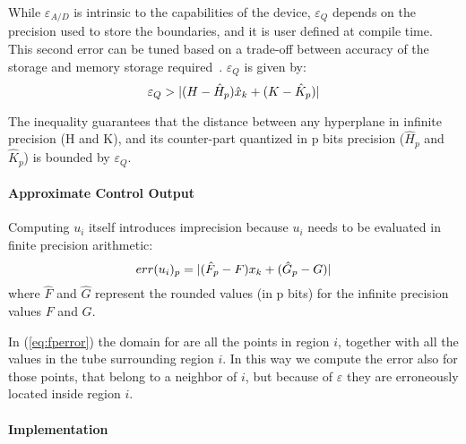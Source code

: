 While $\varepsilon_{A/D}$ is intrinsic to the capabilities of the device,
$\varepsilon_{Q}$ depends on the precision used to store the boundaries, and it is user defined at compile time. This
second error can be tuned based on a trade-off between accuracy of the storage and
memory storage required~\cite{memoryMPC}.
%
$\varepsilon_{Q}$ is given by:
\begin{equation}\label{eq:quantizationlines}
  \varepsilon_{Q} > |(H-\hat{H}_{p})\hat{x}_{k}+(K-\hat{K}_{p})|
\end{equation}

The inequality guarantees that the distance between any hyperplane in infinite precision (H and K), and its counter-part quantized in p bits precision ($\hat{H}_{p}$ and $\hat{K}_{p}$) is bounded by $\varepsilon_{Q}$.


\paragraph{Approximate Control Output}

Computing $u_{i}$ itself introduces imprecision because $u_i$ needs to be evaluated 
in finite precision arithmetic:
\begin{equation}\label{eq:fperror}
  err(u_{i})_{p}=|(\hat{F}_{p}-F)x_{k}+(\hat{G}_{p}-G)|
\end{equation}
where $\hat{F}$ and $\hat{G}$ represent the rounded values (in p bits) for the infinite precision values $F$ and $G$.

In (\ref{eq:fperror}) the domain for \statevarmath are all the points in region $i$, together with all the values in the tube surrounding region $i$. 
In this way we compute the error also for those points, that belong to a neighbor of $i$, but because of $\varepsilon$ they are erroneously located inside region $i$.

\paragraph{Implementation}


